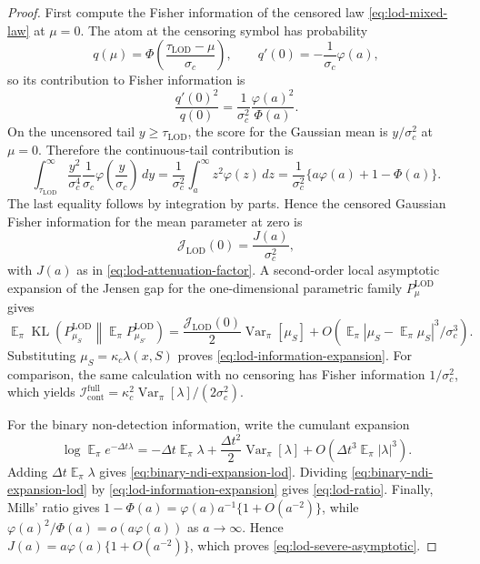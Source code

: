 \documentclass[11pt]{article}
\DeclareMathOperator{\E}{\mathbb{E}}
\DeclareMathOperator{\Var}{\mathrm{Var}}
\DeclareMathOperator{\KL}{\mathrm{KL}}
\newcommand{\dt}{\Delta t}
\newcommand{\Icont}{\mathcal{I}_{\mathrm{cont}}}
\newcommand{\ph}{\varphi}
\newcommand{\Ph}{\Phi}
\begin{document}
\begin{proof}
First compute the Fisher information of the censored law \eqref{eq:lod-mixed-law} at $\mu=0$.  The atom at the censoring symbol has probability
\[
        q(\mu)=\Ph\!\left(\frac{\tau_{\mathrm{LOD}}-\mu}{\sigma_c}\right),
        \qquad
        q'(0)=-\frac{1}{\sigma_c}\ph(a),
\]
so its contribution to Fisher information is
\[
        \frac{q'(0)^2}{q(0)}
        =
        \frac{1}{\sigma_c^2}\frac{\ph(a)^2}{\Ph(a)} .
\]
On the uncensored tail $y\geq\tau_{\mathrm{LOD}}$, the score for the Gaussian mean is $y/\sigma_c^2$ at $\mu=0$.  Therefore the continuous-tail contribution is
\[
        \int_{\tau_{\mathrm{LOD}}}^{\infty}
        \frac{y^2}{\sigma_c^4}
        \frac{1}{\sigma_c}\ph\!\left(\frac{y}{\sigma_c}\right)\,dy
        =
        \frac{1}{\sigma_c^2}\int_a^{\infty}z^2\ph(z)\,dz
        =
        \frac{1}{\sigma_c^2}\{a\ph(a)+1-\Ph(a)\}.
\]
The last equality follows by integration by parts.  Hence the censored Gaussian Fisher information for the mean parameter at zero is
\[
        \mathcal{J}_{\mathrm{LOD}}(0)
        =
        \frac{J(a)}{\sigma_c^2},
\]
with $J(a)$ as in \eqref{eq:lod-attenuation-factor}.  A second-order local asymptotic expansion of the Jensen gap for the one-dimensional parametric family $P_{\mu}^{\mathrm{LOD}}$ gives
\[
        \E_{\pi}
        \KL\!\left(P_{\mu_S}^{\mathrm{LOD}}
        \middle\|
        \E_{\pi}P_{\mu_{S'}}^{\mathrm{LOD}}\right)
        =
        \frac{\mathcal{J}_{\mathrm{LOD}}(0)}{2}\Var_{\pi}[\mu_S]
        +
        O\!\left(\E_{\pi}|\mu_S-\E_{\pi}\mu_S|^3/\sigma_c^3\right).
\]
Substituting $\mu_S=\kappa_c\lambda(x,S)$ proves \eqref{eq:lod-information-expansion}.  For comparison, the same calculation with no censoring has Fisher information $1/\sigma_c^2$, which yields $\Icont^{\mathrm{full}}=\kappa_c^2\Var_{\pi}[\lambda]/(2\sigma_c^2)$.

For the binary non-detection information, write the cumulant expansion
\[
        \log\E_{\pi}e^{-\dt\lambda}
        =
        -\dt\E_{\pi}\lambda
        +
        \frac{\dt^2}{2}\Var_{\pi}[\lambda]
        +
        O(\dt^3\E_{\pi}|\lambda|^3).
\]
Adding $\dt\E_{\pi}\lambda$ gives \eqref{eq:binary-ndi-expansion-lod}.  Dividing \eqref{eq:binary-ndi-expansion-lod} by \eqref{eq:lod-information-expansion} gives \eqref{eq:lod-ratio}.  Finally, Mills' ratio gives $1-\Ph(a)=\ph(a)a^{-1}\{1+O(a^{-2})\}$, while $\ph(a)^2/\Ph(a)=o(a\ph(a))$ as $a\to\infty$.  Hence $J(a)=a\ph(a)\{1+O(a^{-2})\}$, which proves \eqref{eq:lod-severe-asymptotic}.
\end{proof}
\end{document}
